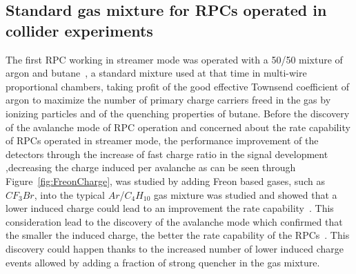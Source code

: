 	\subsection{Standard gas mixture for RPCs operated in collider experiments}
	\label{chat4:ssec:gasmix}
	
	The first RPC working in streamer mode was operated with a 50/50 mixture of argon and butane~\cite{SANTONICO81}, a standard mixture used at that time in multi-wire proportional chambers, taking profit of the good effective Townsend coefficient of argon to maximize the number of primary charge carriers freed in the gas by ionizing particles and of the quenching properties of butane. Before the discovery of the avalanche mode of RPC operation and concerned about the rate capability of RPCs operated in streamer mode, the performance improvement of the detectors through the increase of fast charge ratio in the signal development ,decreasing the charge induced per avalanche as can be seen through Figure~\ref{fig:FreonCharge}, was studied by adding Freon based gases, such as $CF_3Br$, into the typical $Ar$/$C_4H_{10}$ gas mixture was studied and showed that a lower induced charge could lead to an improvement the rate capability~\cite{CARDARELLI93}. This consideration lead to the discovery of the avalanche mode which confirmed that the smaller the induced charge, the better the rate capability of the RPCs~\cite{CROTTY93}. This discovery could happen thanks to the increased number of lower induced charge events allowed by adding a fraction of strong quencher in the gas mixture.
	
